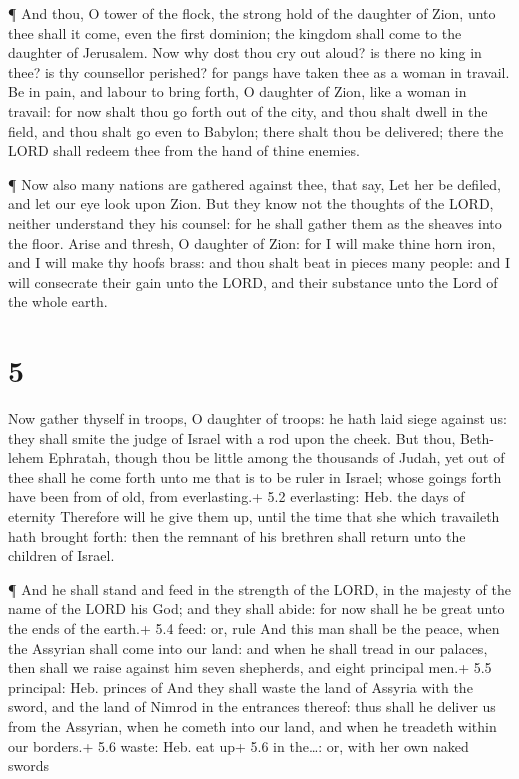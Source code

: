  ¶ And thou, O tower of the flock, the strong hold of the
daughter of Zion, unto thee shall it come, even the first dominion; the
kingdom shall come to the daughter of Jerusalem.  Now why
dost thou cry out aloud? is there no king in thee? is thy counsellor
perished? for pangs have taken thee as a woman in travail. 
Be in pain, and labour to bring forth, O daughter of Zion, like a woman
in travail: for now shalt thou go forth out of the city, and thou shalt
dwell in the field, and thou shalt go even to Babylon; there shalt thou
be delivered; there the LORD shall redeem thee from the hand of thine
enemies.

 ¶ Now also many nations are gathered against thee, that
say, Let her be defiled, and let our eye look upon Zion. 
But they know not the thoughts of the LORD, neither understand they his
counsel: for he shall gather them as the sheaves into the floor.
 Arise and thresh, O daughter of Zion: for I will make
thine horn iron, and I will make thy hoofs brass: and thou shalt beat in
pieces many people: and I will consecrate their gain unto the LORD, and
their substance unto the Lord of the whole earth.

\hypertarget{section-4}{%
\section{5}\label{section-4}}

 Now gather thyself in troops, O daughter of troops: he hath
laid siege against us: they shall smite the judge of Israel with a rod
upon the cheek.  But thou, Beth-lehem Ephratah, though thou
be little among the thousands of Judah, yet out of thee shall he come
forth unto me that is to be ruler in Israel; whose goings forth have
been from of old, from everlasting.+ 5.2 everlasting: Heb. the days of
eternity  Therefore will he give them up, until the time
that she which travaileth hath brought forth: then the remnant of his
brethren shall return unto the children of Israel.

 ¶ And he shall stand and feed in the strength of the LORD,
in the majesty of the name of the LORD his God; and they shall abide:
for now shall he be great unto the ends of the earth.+ 5.4 feed: or,
rule  And this man shall be the peace, when the Assyrian
shall come into our land: and when he shall tread in our palaces, then
shall we raise against him seven shepherds, and eight principal men.+
5.5 principal: Heb. princes of  And they shall waste the
land of Assyria with the sword, and the land of Nimrod in the entrances
thereof: thus shall he deliver us from the Assyrian, when he cometh into
our land, and when he treadeth within our borders.+ 5.6 waste: Heb. eat
up+ 5.6 in the\ldots: or, with her own naked swords


